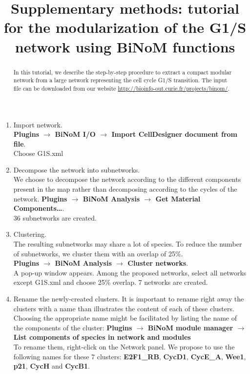 \documentclass[a4paper,10pt]{article}
\title{Supplementary methods: tutorial for the modularization of the G1/S network using BiNoM functions}
\author{}
\begin{document}
\maketitle

\begin{abstract}
In this tutorial, we describe the step-by-step procedure to extract a compact modular network from a large network representing the cell cycle G1/S transition. The input file can be downloaded from our website \url{http://bioinfo-out.curie.fr/projects/binom/}.
\end{abstract}


\begin{enumerate}
\item Import network. \\
\textbf{Plugins $\rightarrow$ BiNoM I/O $\rightarrow$ Import CellDesigner document
from file}.  \\
Choose G1S.xml


\item	Decompose the network into subnetworks. \\
We choose to decompose the network according to the different components present
in the map rather than decomposing according to the cycles of the network. 
\textbf{Plugins $\rightarrow$ BiNoM Analysis $\rightarrow$ Get Material
Components…}.\\
36 subnetworks are created.

\item	Clustering. \\
The resulting subnetworks may share a lot of species. To reduce the number of
subnetworks, we cluster them with an overlap of 25\%. \\
\textbf{Plugins $\rightarrow$ BiNoM Analysis $\rightarrow$ Cluster networks}. \\
A pop-up window appears. Among the proposed networks, select all networks except
G1S.xml and choose 25\% overlap. 7 networks are created.

\item	Rename the newly-created clusters.
It is important to rename right away the clusters with a name than illustrates
the content of each of these clusters. 
Choosing the appropriate name might be facilitated by listing the name of the
components of the cluster: \textbf{Plugins $\rightarrow$ BiNoM module manager
$\rightarrow$ List components of species in network and modules} \\
To rename them, right-click on the Network panel.
We propose to use the following names for these 7 clusters: \textbf{E2F1\_RB},
\textbf{CycD1}, \textbf{CycE\_A}, \textbf{Wee1}, \textbf{p21}, \textbf{CycH} and
\textbf{CycB1}.



\end{enumerate}
\end{document}
